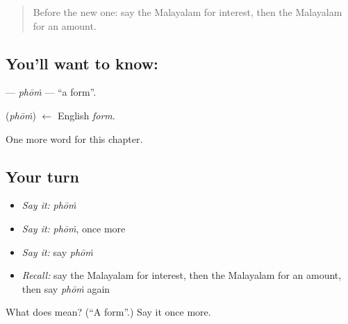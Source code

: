 \label{lesson:ML-C288-phom}



\begin{quote}
Before the new one: say the Malayalam for interest, then the Malayalam for an amount.
\end{quote}

\subsection*{You'll want to know: }
\textbf{} — \emph{phōṁ} — \textquotedblleft{}a form\textquotedblright{}.

\begin{cousinweb}
\textbf{} (\emph{phōṁ}) $\leftarrow$ English \emph{form}.
\end{cousinweb}

\begin{grammarlens}[title={What you've built}]
One more word for this chapter.
\end{grammarlens}

\subsection*{Your turn}
\begin{itemize}
\raggedright
  \item \emph{Say it:} \emph{phōṁ}
  \item \emph{Say it:} \emph{phōṁ}, once more
  \item \emph{Say it:} say \emph{phōṁ}
  \item \emph{Recall:} say the Malayalam for interest, then the Malayalam for an amount, then say \emph{phōṁ} again
\end{itemize}

\begin{tcolorbox}[breakable,colback=teal!4,colframe=teal!35!black,title={Before you move on}]
What does  mean? (\textquotedblleft{}A form\textquotedblright{}.) Say it once more.
\end{tcolorbox}
